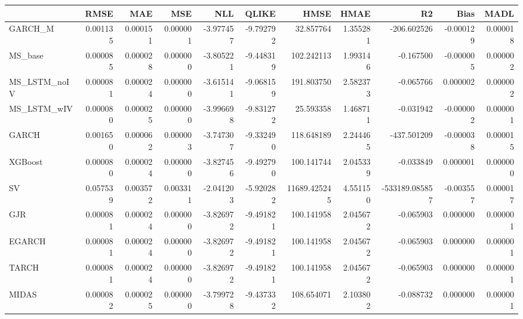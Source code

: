 \begin{tabular}{lrrrrrrrrrr}
\toprule
 & RMSE & MAE & MSE & NLL & QLIKE & HMSE & HMAE & R2 & Bias & MADL \\
\midrule
GARCH_M & 0.001135 & 0.000151 & 0.000001 & -3.977457 & -9.792792 & 32.857764 & 1.355281 & -206.602526 & -0.000129 & 0.000018 \\
MS_base & 0.000085 & 0.000028 & 0.000000 & -3.805221 & -9.448319 & 102.242113 & 1.993146 & -0.167500 & -0.000005 & 0.000002 \\
MS_LSTM_noIV & 0.000081 & 0.000024 & 0.000000 & -3.615141 & -9.068159 & 191.803750 & 2.582373 & -0.065766 & 0.000002 & 0.000002 \\
MS_LSTM_wIV & 0.000080 & 0.000025 & 0.000000 & -3.996698 & -9.831272 & 25.593358 & 1.468711 & -0.031942 & -0.000002 & 0.000001 \\
GARCH & 0.001650 & 0.000062 & 0.000003 & -3.747307 & -9.332490 & 118.648189 & 2.244465 & -437.501209 & -0.000038 & 0.000015 \\
XGBoost & 0.000080 & 0.000024 & 0.000000 & -3.827456 & -9.492790 & 100.141744 & 2.045339 & -0.033849 & 0.000001 & 0.000000 \\
SV & 0.057539 & 0.003572 & 0.003311 & -2.041203 & -5.920282 & 11689.425245 & 4.551150 & -533189.085857 & -0.003557 & 0.000017 \\
GJR & 0.000081 & 0.000024 & 0.000000 & -3.826972 & -9.491821 & 100.141958 & 2.045672 & -0.065903 & 0.000000 & 0.000001 \\
EGARCH & 0.000081 & 0.000024 & 0.000000 & -3.826972 & -9.491821 & 100.141958 & 2.045672 & -0.065903 & 0.000000 & 0.000001 \\
TARCH & 0.000081 & 0.000024 & 0.000000 & -3.826972 & -9.491821 & 100.141958 & 2.045672 & -0.065903 & 0.000000 & 0.000001 \\
MIDAS & 0.000082 & 0.000025 & 0.000000 & -3.799728 & -9.437332 & 108.654071 & 2.103802 & -0.088732 & 0.000000 & 0.000001 \\
\bottomrule
\end{tabular}
